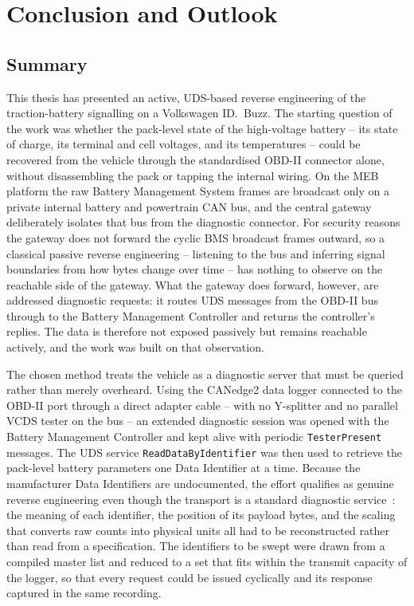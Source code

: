 \documentclass[11pt,a4paper,oneside,parskip=half]{scrreprt}
\begin{document}

\chapter{Conclusion and Outlook}
\section{Summary}
This thesis has presented an active, UDS-based reverse engineering of the traction-battery signalling on a Volkswagen ID.~Buzz. The starting question of the work was whether the pack-level state of the high-voltage battery -- its state of charge, its terminal and cell voltages, and its temperatures -- could be recovered from the vehicle through the standardised OBD-II connector alone, without disassembling the pack or tapping the internal wiring. On the MEB platform the raw Battery Management System frames are broadcast only on a private internal battery and powertrain CAN bus, and the central gateway deliberately isolates that bus from the diagnostic connector. For security reasons the gateway does not forward the cyclic BMS broadcast frames outward, so a classical passive reverse engineering -- listening to the bus and inferring signal boundaries from how bytes change over time -- has nothing to observe on the reachable side of the gateway. What the gateway does forward, however, are addressed diagnostic requests: it routes UDS messages from the OBD-II bus through to the Battery Management Controller and returns the controller's replies. The data is therefore not exposed passively but remains reachable actively, and the work was built on that observation.

The chosen method treats the vehicle as a diagnostic server that must be queried rather than merely overheard. Using the CANedge2 data logger connected to the OBD-II port through a direct adapter cable -- with no Y-splitter and no parallel VCDS tester on the bus -- an extended diagnostic session was opened with the Battery Management Controller and kept alive with periodic \texttt{TesterPresent} messages. The UDS service \texttt{ReadDataByIdentifier} was then used to retrieve the pack-level battery parameters one Data Identifier at a time. Because the manufacturer Data Identifiers are undocumented, the effort qualifies as genuine reverse engineering even though the transport is a standard diagnostic service~\cite{iso14229}: the meaning of each identifier, the position of its payload bytes, and the scaling that converts raw counts into physical units all had to be reconstructed rather than read from a specification. The identifiers to be swept were drawn from a compiled master list and reduced to a set that fits within the transmit capacity of the logger, so that every request could be issued cyclically and its response captured in the same recording.
\end{document}
